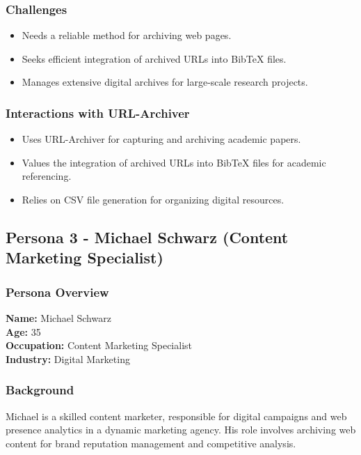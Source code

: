 \subsubsection{Challenges}
\begin{itemize}
    \item Needs a reliable method for archiving web pages.
    \item Seeks efficient integration of archived URLs into BibTeX files.
    \item Manages extensive digital archives for large-scale research projects.
\end{itemize}

\subsubsection{Interactions with URL-Archiver}
\begin{itemize}
    \item Uses URL-Archiver for capturing and archiving academic papers.
    \item Values the integration of archived URLs into BibTeX files for academic referencing.
    \item Relies on CSV file generation for organizing digital resources.
\end{itemize}

\subsection{Persona 3 - Michael Schwarz (Content Marketing Specialist)}

\subsubsection{Persona Overview}

\textbf{Name:} Michael Schwarz \\
\textbf{Age:} 35 \\
\textbf{Occupation:} Content Marketing Specialist \\
\textbf{Industry:} Digital Marketing

\subsubsection{Background}
Michael is a skilled content marketer, responsible for digital campaigns and web presence analytics in a dynamic marketing agency.
His role involves archiving web content for brand reputation management and competitive analysis.

